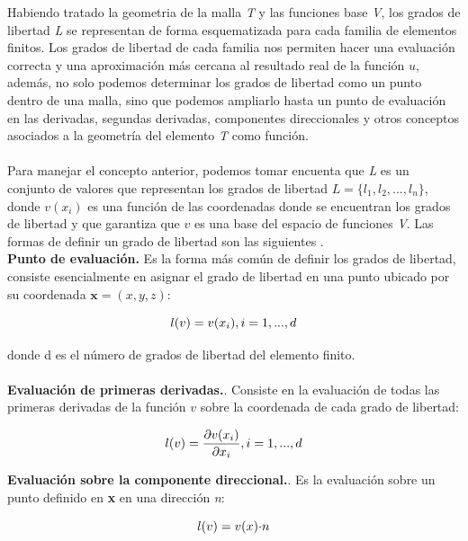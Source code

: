 Habiendo tratado la geometria de la malla \textit{T} y las funciones base \textit{V}, los grados de libertad \textit{L} se representan de forma esquematizada para cada familia de elementos finitos. Los grados de libertad de cada familia nos permiten hacer una evaluación correcta y una aproximación más cercana al resultado real de la función $u$, además, no solo podemos determinar  los grados de libertad como un punto dentro de una malla, sino que podemos ampliarlo hasta un punto de evaluación en las derivadas, segundas derivadas, componentes direccionales y otros conceptos asociados a la geometría del elemento \textit{T} como función.
\\
\\
Para manejar el concepto anterior, podemos tomar encuenta que \textit{L} es un conjunto de valores que representan los grados de libertad $\textit{L}=\{l_{1},l_{2},...,l_{n}\}$, donde $v(x_{i})$ es una función de las coordenadas donde se encuentran los grados de libertad y que garantiza que $v$ es una base del espacio de funciones \textit{V}. Las formas de definir un grado de libertad son las siguientes \cite{Logg2012}.
\\

\textbf{Punto de evaluación.} Es la forma más común de definir los grados de libertad, consiste esencialmente en asignar el grado de libertad en una punto ubicado por su coordenada $\textbf{x}=(x,y,z)$:

\begin{equation}
\label{eqn:fe22}
    \\l(v)=v(x_{i}),  i=1,...,d        
\end{equation}

donde d es el número de grados de libertad del elemento finito.
\\
\\
\textbf{Evaluación de primeras derivadas.}. Consiste en la evaluación de todas las primeras derivadas de la función $v$ sobre la coordenada de cada grado de libertad:

\begin{equation}
\label{eqn:fe23}
    \\l(v)=  \dfrac{{\partial}v(x_{i})}{\partial{x_{i}}},  i=1,...,d              
\end{equation}

\textbf{Evaluación sobre la componente direccional.}. Es la evaluación sobre un punto definido en \textbf{x} en una dirección \textit{n}:

\begin{equation}
\label{eqn:fe24}
    \\l(v)=  v(x){\cdot}n            
\end{equation}

